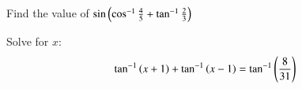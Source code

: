 \item Find the value of $\sin\left(\cos^{-1}{\frac{4}{5}}+{\tan^{-1}{\frac{2}{3}}}\right)$
\item Solve for $x$:
	\begin{align*}
	\tan^{-1}\left(x+1\right)+\tan^{-1}\left(x-1\right)=\tan^{-1}\left(\dfrac{8}{31}\right)
	\end{align*}

